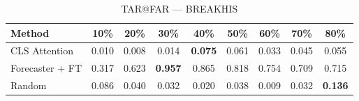 \begin{table}[h]
\caption{TAR@FAR — BREAKHIS}
\begin{tabular}{lcccccccc}
\toprule
Method & 10\% & 20\% & 30\% & 40\% & 50\% & 60\% & 70\% & 80\% \\
\midrule
CLS Attention & 0.010 & 0.008 & 0.014 & \textbf{0.075} & 0.061 & 0.033 & 0.045 & 0.055 \\
Forecaster + FT & 0.317 & 0.623 & \textbf{0.957} & 0.865 & 0.818 & 0.754 & 0.709 & 0.715 \\
Random & 0.086 & 0.040 & 0.032 & 0.020 & 0.038 & 0.009 & 0.032 & \textbf{0.136} \\
\bottomrule
\end{tabular}
\end{table}